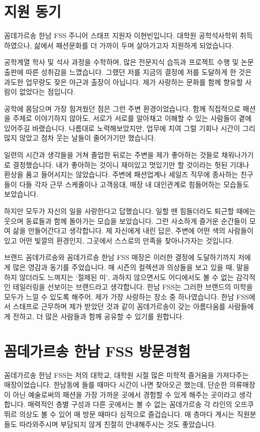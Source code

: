 \section*{지원 동기}
꼼데가르송 한남 FSS 주니어 스태프 지원자 이현빈입니다. 대학원 공학석사학위 취득하였으나, 삶에서 패션문화를 더 가까이 두며 살아가고자 지원하게 되었습니다.

공학계열 학사 및 석사 과정을 수학하며, 많은 전문지식 습득과 프로젝트 수행 및 논문출판에 따른 성취감을 느꼈습니다. 그랬던 저를 지금의 결정에 저를 도달하게 한 것은 과도한 업무량도 잦은 야근과 출장이 아닙니다. 제가 사랑하는 문화를 함께 향유할 사람이 없었다는 점입니다.

공학에 몸담으며 가장 힘겨웠던 점은 그런 주변 환경이었습니다. 함께 직접적으로 패션을 주제로 이야기하지 않아도, 서로가 서로를 알아채고 이해할 수 있는 사람들이 곁에 있어주길 바랬습니다. 나름대로 노력해보았지만, 업무에 치여 그럴 기회나 시간이 그리 많지 않았고 점차 웃는 날들이 줄어가기만 했습니다.

일련의 시간과 생각들을 거쳐 졸업한 뒤로는 주변을 제가 좋아하는 것들로 채워나가기로 결정했습니다. 내가 좋아하는 것이니 재미있고 멋있기만 할 것이라는 헛된 기대나 환상을 품고 들어서지는 않았습니다. 주변에 패션업계나 세일즈 직무에 종사하는 친구들이 다들 각자 근무 스케줄이나 고객응대, 매장 내 대인관계로 힘들어하는 모습들도 보았습니다.

하지만 모두가 자신의 일을 사랑한다고 답했습니다. 일할 땐 힘들더라도 퇴근할 때에는 웃으며 동료들과 함께 돌아가는 모습을 보았습니다. 그런 사소하게 즐거운 순간들이 모여 삶을 만들어간다고 생각합니다. 제 자신에게 내린 답은, 주변에 어떤 색의 사람들이 있고 어떤 빛깔의 환경인지, 그곳에서 스스로의 만족을 찾아나가자는 것입니다.

브랜드 꼼데가르송와 꼼데가르송 한남 FSS 매장은 이러한 결정에 도달하기까지 저에게 많은 영감과 동기를 주었습니다. 매 시즌의 컬렉션과 의상들을 보고 있을 때, 말을 하지 않더라도 느껴지는 `절제된 미', 과하지 않으면서도 어디에서도 볼 수 없는 감각적인 테일러링을 선보이는 브랜드라고 생각합니다. 한남 FSS는 그러한 브랜드의 미학을 모두가 느낄 수 있도록 해주어, 제가 가장 사랑하는 장소 중 하나였습니다. 한남 FSS에서 스태프로 근무하며 제가 받았던 것과 같이 꼼데가르송이 갖는 아름다움를 사람들에게 전하고, 더 많은 사람들과 함께 공유할 수 있기를 원합니다.

\section*{꼼데가르송 한남 FSS 방문경험}
꼼데가르송 한남 FSS는 저의 대학교, 대학원 시절 많은 미학적 즐거움을 가져다주는 매장이었습니다. 한남동에 들를 때마다 시간이 나면 찾아오곤 했는데, 단순한 의류매장이 아닌 예술로써의 패션을 가장 가까운 곳에서 경험할 수 있게 해주는 곳이라고 생각합니다. 매력적인 층별 구성과 다른 곳에서는 볼 수 없는 꼼데가르송 각 라인의 오뜨쿠뛰르 의상도 볼 수 있어 매 방문 때마다 심적으로 즐겁습니다. 매 층마다 계시는 직원분들도 따라와주시며 부담되지 않게 친절히 안내해주시는 것도 좋았습니다.

